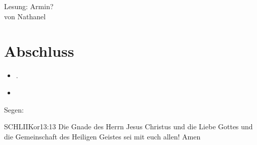 \documentclass[fontsize=14pt]{mybib}
\newcommand{\Name}{Nathanel}
\begin{document}
    Lesung: Armin?\\
    von \Name

\section{Abschluss}
\begin{itemize}
    \item [] .
    \item [] 
\end{itemize}

Segen: \\
\begin{bibelbox}{SCHL}{IIKor}{13:13}
    Die Gnade des Herrn Jesus Christus und die Liebe Gottes und die Gemeinschaft des Heiligen Geistes sei mit euch allen! Amen
\end{bibelbox}
\end{document}
